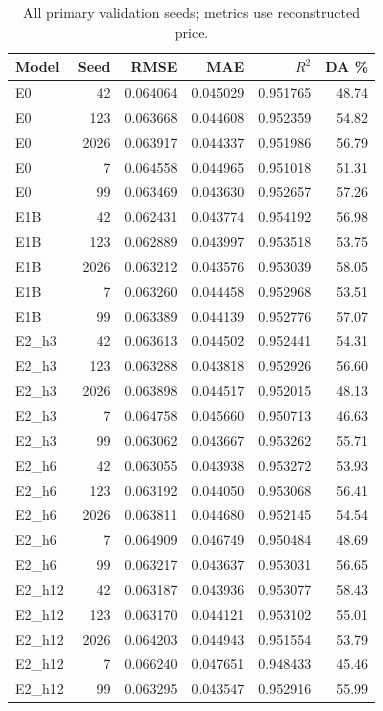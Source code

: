 \begin{table}[htbp]\centering\small
\caption{All primary validation seeds; metrics use reconstructed price.}\label{tab:validationseeds}
\begin{tabular}{lrrrrr}\toprule
Model & Seed & RMSE & MAE & $R^2$ & DA \%\\\midrule
E0 & 42 & 0.064064 & 0.045029 & 0.951765 & 48.74\\
E0 & 123 & 0.063668 & 0.044608 & 0.952359 & 54.82\\
E0 & 2026 & 0.063917 & 0.044337 & 0.951986 & 56.79\\
E0 & 7 & 0.064558 & 0.044965 & 0.951018 & 51.31\\
E0 & 99 & 0.063469 & 0.043630 & 0.952657 & 57.26\\
E1B & 42 & 0.062431 & 0.043774 & 0.954192 & 56.98\\
E1B & 123 & 0.062889 & 0.043997 & 0.953518 & 53.75\\
E1B & 2026 & 0.063212 & 0.043576 & 0.953039 & 58.05\\
E1B & 7 & 0.063260 & 0.044458 & 0.952968 & 53.51\\
E1B & 99 & 0.063389 & 0.044139 & 0.952776 & 57.07\\
E2\_h3 & 42 & 0.063613 & 0.044502 & 0.952441 & 54.31\\
E2\_h3 & 123 & 0.063288 & 0.043818 & 0.952926 & 56.60\\
E2\_h3 & 2026 & 0.063898 & 0.044517 & 0.952015 & 48.13\\
E2\_h3 & 7 & 0.064758 & 0.045660 & 0.950713 & 46.63\\
E2\_h3 & 99 & 0.063062 & 0.043667 & 0.953262 & 55.71\\
E2\_h6 & 42 & 0.063055 & 0.043938 & 0.953272 & 53.93\\
E2\_h6 & 123 & 0.063192 & 0.044050 & 0.953068 & 56.41\\
E2\_h6 & 2026 & 0.063811 & 0.044680 & 0.952145 & 54.54\\
E2\_h6 & 7 & 0.064909 & 0.046749 & 0.950484 & 48.69\\
E2\_h6 & 99 & 0.063217 & 0.043637 & 0.953031 & 56.65\\
E2\_h12 & 42 & 0.063187 & 0.043936 & 0.953077 & 58.43\\
E2\_h12 & 123 & 0.063170 & 0.044121 & 0.953102 & 55.01\\
E2\_h12 & 2026 & 0.064203 & 0.044943 & 0.951554 & 53.79\\
E2\_h12 & 7 & 0.066240 & 0.047651 & 0.948433 & 45.46\\
E2\_h12 & 99 & 0.063295 & 0.043547 & 0.952916 & 55.99\\

\end{tabular}
\end{table}
